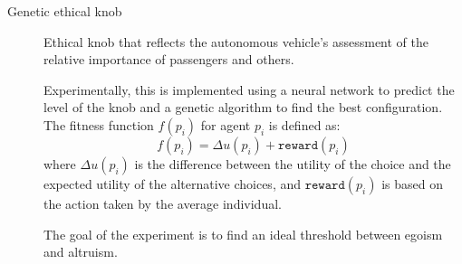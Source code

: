 \begin{description}
    \item[Genetic ethical knob] 
        Ethical knob that reflects the autonomous vehicle's assessment of the relative importance of passengers and others.

        Experimentally, this is implemented using a neural network to predict the level of the knob and a genetic algorithm to find the best configuration. The fitness function $f(p_i)$  for agent $p_i$ is defined as:
        \[
            f(p_i) = \Delta u(p_i) + \texttt{reward}(p_i)
        \]
        where $\Delta u(p_i)$ is the difference between the utility of the choice and the expected utility of the alternative choices, and $\texttt{reward}(p_i)$ is based on the action taken by the average individual.
        
        The goal of the experiment is to find an ideal threshold between egoism and altruism.
\end{description}